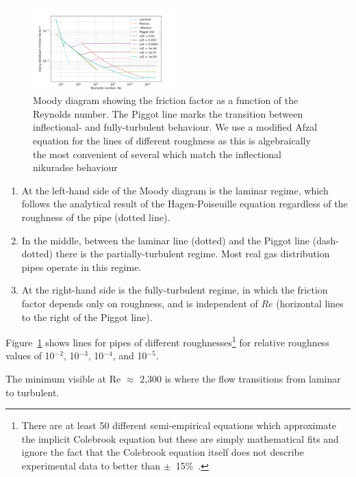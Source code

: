 \documentclass[5p]{elsarticle} %
\begin{document}
\begin{figure}[ht]
\centering
\includegraphics[width=0.49\textwidth]{moody_afzal.png}
\caption{Moody diagram showing the friction factor as a function of the Reynolds number. The Piggot line
marks the transition between inflectional- and fully-turbulent behaviour\citep{Moody1944}. We use a modified Afzal equation\citep{Cerbus2018}  for the lines of different roughness as this is algebraically the most convenient of several which match the inflectional nikuradse behaviour\citep{Allen2007,Goldenfeld2006}}
\label{fig:moody}
\end{figure}

\begin{enumerate}
    \item At the left-hand side of the Moody diagram is the laminar regime, which follows the analytical result of the Hagen-Poiseuille equation regardless of the roughness of the pipe (dotted line). 
    \item In the middle, between the laminar line (dotted) and the Piggot line (dash-dotted) there is the partially-turbulent regime. Most real gas distribution pipes operate in this regime.
    \item At the right-hand side is the fully-turbulent regime, in which the friction factor depends only on roughness, and is independent of $Re$ (horizontal lines to the right of the Piggot line).
\end{enumerate}

Figure~\ref{fig:moody} shows lines for pipes of different 
roughnesses\footnote{There are at least 50 different semi-empirical equations which approximate the implicit Colebrook equation but these are simply mathematical fits and ignore the fact that  the Colebrook equation itself does not describe experimental data to better than $\pm$~15\%~\cite{Allen2007, Cerbus2018, She2012}.  
} 
 for relative roughness values of 10$^{-2}$, 10$^{-3}$, 10$^{-4}$, and 10$^{-5}$. 

The minimum visible at Re $\approx$ 2,300 is where the flow transitions from laminar to turbulent\citep{Allen2007}. 
\end{document}
